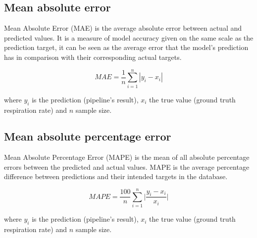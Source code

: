 \subsection{Mean absolute error} \label{cap:mae}
Mean Absolute Error (MAE) is the average absolute error between actual and predicted values.  It is a measure of model accuracy given on the same scale as the prediction target, it can be seen as the average error that the model's prediction has in comparison with their corresponding actual targets.

\vspace{0.45cm}

$$MAE = \frac{1}{n} \sum_{i=1}^{n}|y_i-x_i|$$

\vspace{0.45cm}

where $y_i$ is the prediction (pipeline's result), $x_i$ the true value (ground truth respiration rate) and $n$ sample size.

\subsection {Mean absolute percentage error} \label{cap:mape}
Mean Absolute Percentage Error (MAPE) is the mean of all absolute percentage errors between the predicted and actual values.
MAPE is the average percentage difference between predictions and their intended targets in the database.
\vspace{0.45cm}

$$MAPE = \frac{100}{n} \sum_{i=1}^{n}\bigg | \frac{y_i-x_i}{x_i}\bigg |$$ 

\vspace{0.4cm}

where $y_i$ is the prediction (pipeline's result), $x_i$ the true value (ground truth respiration rate) and $n$ sample size. 

 


